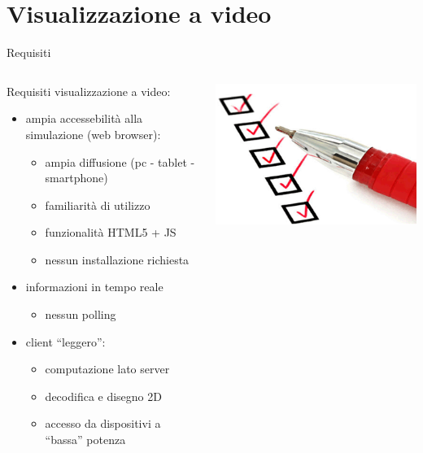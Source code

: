 %
%
\section{Visualizzazione a video}
\begin{frame}{Requisiti}
	\begin{columns}
		\begin{column}{0.8\textwidth}
			Requisiti visualizzazione a video:
			\begin{itemize}
				\item{\footnotesize{ampia accessebilità alla simulazione (web browser):}}
				\begin{itemize}
					\item{\scriptsize{ampia diffusione (\tiny{pc - tablet - smartphone}\scriptsize{)}}}
					\item{\scriptsize{familiarità di utilizzo}}
					\item{\scriptsize{funzionalità HTML5 + JS}}
					\item{\scriptsize{nessun installazione richiesta}}
				\end{itemize}
				\item{\footnotesize{informazioni in tempo reale}}
				\begin{itemize}
					\item{\scriptsize{nessun polling}}
				\end{itemize}
				\item{\footnotesize{client ``leggero'':}}
				\begin{itemize}
					\item{\scriptsize{computazione lato server}}
					\item{\scriptsize{decodifica e disegno 2D}}
					\item{\scriptsize{accesso da dispositivi a ``bassa'' potenza}}
				\end{itemize}
			\end{itemize}
		\end{column}
		\begin{column}{0.2\textwidth}
			\includegraphics[scale=0.25]{images/requirement.png}
		\end{column}
	\end{columns}
\end{frame}

